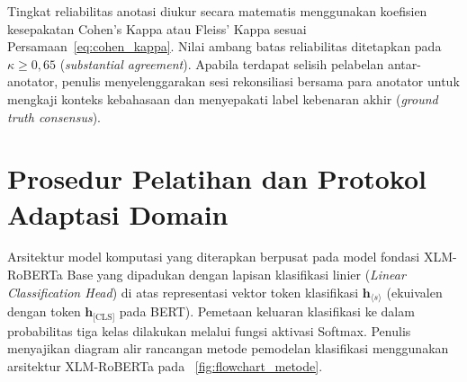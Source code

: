 Tingkat reliabilitas anotasi diukur secara matematis menggunakan koefisien kesepakatan Cohen's Kappa atau Fleiss' Kappa sesuai Persamaan~\eqref{eq:cohen_kappa}. Nilai ambang batas reliabilitas ditetapkan pada $\kappa \ge 0{,}65$ (\textit{substantial agreement}). Apabila terdapat selisih pelabelan antar-anotator, penulis menyelenggarakan sesi rekonsiliasi bersama para anotator untuk mengkaji konteks kebahasaan dan menyepakati label kebenaran akhir (\textit{ground truth consensus}).

\section{Prosedur Pelatihan dan Protokol Adaptasi Domain}

Arsitektur model komputasi yang diterapkan berpusat pada model fondasi XLM-RoBERTa Base yang dipadukan dengan lapisan klasifikasi linier (\textit{Linear Classification Head}) di atas representasi vektor token klasifikasi $\mathbf{h}_{\langle s \rangle}$ (ekuivalen dengan token $\mathbf{h}_{\text{[CLS]}}$ pada BERT). Pemetaan keluaran klasifikasi ke dalam probabilitas tiga kelas dilakukan melalui fungsi aktivasi Softmax. Penulis menyajikan diagram alir rancangan metode pemodelan klasifikasi menggunakan arsitektur XLM-RoBERTa pada \figurename~\ref{fig:flowchart_metode}.

